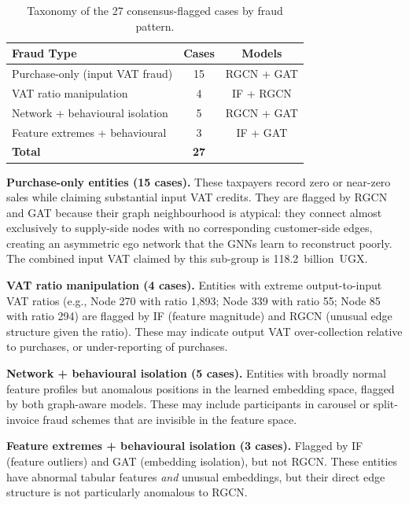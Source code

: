 \documentclass[10pt,twocolumn]{article}
\begin{document}
\begin{table}[htb]
  \centering
  \caption{Taxonomy of the 27 consensus-flagged cases by fraud pattern.}
  \label{tab:fraud_types}
  \small
  \begin{tabular}{p{3.1cm}cc}
    \toprule
    Fraud Type & Cases & Models \\
    \midrule
    Purchase-only (input VAT fraud)    & 15 & RGCN + GAT \\
    VAT ratio manipulation             &  4 & IF + RGCN \\
    Network + behavioural isolation    &  5 & RGCN + GAT \\
    Feature extremes + behavioural     &  3 & IF + GAT \\
    \midrule
    \textbf{Total}                     & \textbf{27} & \\
    \bottomrule
  \end{tabular}
\end{table}

\textbf{Purchase-only entities (15 cases).} These taxpayers record zero or
near-zero sales while claiming substantial input VAT credits. They are
flagged by RGCN and GAT because their graph neighbourhood is atypical:
they connect almost exclusively to supply-side nodes with no corresponding
customer-side edges, creating an asymmetric ego network that the GNNs learn
to reconstruct poorly. The combined input VAT claimed by this sub-group
is 118.2~billion~UGX.

\textbf{VAT ratio manipulation (4 cases).} Entities with extreme
output-to-input VAT ratios (e.g., Node 270 with ratio 1,893; Node 339 with
ratio 55; Node 85 with ratio 294) are flagged by IF (feature magnitude) and
RGCN (unusual edge structure given the ratio). These may indicate output VAT
over-collection relative to purchases, or under-reporting of purchases.

\textbf{Network + behavioural isolation (5 cases).} Entities with broadly
normal feature profiles but anomalous positions in the learned embedding space,
flagged by both graph-aware models. These may include participants in carousel
or split-invoice fraud schemes that are invisible in the feature space.

\textbf{Feature extremes + behavioural isolation (3 cases).} Flagged by IF
(feature outliers) and GAT (embedding isolation), but not RGCN. These entities
have abnormal tabular features \emph{and} unusual embeddings, but their direct
edge structure is not particularly anomalous to RGCN.
\end{document}
